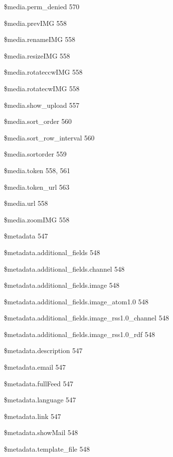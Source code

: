 \documentclass{book}
\renewcommand\subitem{\par}
\begin{document}
\begin{multicols}{2}
\begin{osp-index}
    \subitem \$media.perm\_denied\hspace{1mm} 570
    \subitem \$media.prevIMG\hspace{1mm} 558
    \subitem \$media.renameIMG\hspace{1mm} 558
    \subitem \$media.resizeIMG\hspace{1mm} 558
    \subitem \$media.rotateccwIMG\hspace{1mm} 558
    \subitem \$media.rotatecwIMG\hspace{1mm} 558
    \subitem \$media.show\_upload\hspace{1mm} 557
    \subitem \$media.sort\_order\hspace{1mm} 560
    \subitem \$media.sort\_row\_interval\hspace{1mm} 560
    \subitem \$media.sortorder\hspace{1mm} 559
    \subitem \$media.token\hspace{1mm} 558, 561
    \subitem \$media.token\_url\hspace{1mm} 563
    \subitem \$media.url\hspace{1mm} 558
    \subitem \$media.zoomIMG\hspace{1mm} 558
    \subitem \$metadata\hspace{1mm} 547
    \subitem \$metadata.additional\_fields\hspace{1mm} 548
    \subitem \$metadata.additional\_fields.channel\hspace{1mm} 548
    \subitem \$metadata.additional\_fields.image\hspace{1mm} 548
    \subitem \$metadata.additional\_fields.image\_atom1.0\hspace{1mm} 
		548
    \subitem \$metadata.additional\_fields.image\_rss1.0\_channel\hspace{1mm} 
		548
    \subitem \$metadata.additional\_fields.image\_rss1.0\_rdf\hspace{1mm} 
		548
    \subitem \$metadata.description\hspace{1mm} 547
    \subitem \$metadata.email\hspace{1mm} 547
    \subitem \$metadata.fullFeed\hspace{1mm} 547
    \subitem \$metadata.language\hspace{1mm} 547
    \subitem \$metadata.link\hspace{1mm} 547
    \subitem \$metadata.showMail\hspace{1mm} 548
    \subitem \$metadata.template\_file\hspace{1mm} 548

\end{osp-index}
\end{multicols}
\end{document}
